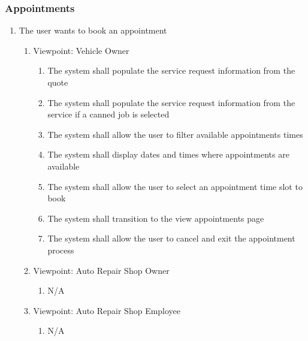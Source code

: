 \documentclass[12pt]{article}
\begin{document}
\subsubsection{Appointments}
\begin{enumerate}[resume*=business_events]
	\item The user wants to book an appointment
	      \begin{enumerate}[VP\arabic*.]
		      \item Viewpoint: Vehicle Owner
		            \begin{enumerate}
			            \item The system shall populate the service request information from the quote
			            \item The system shall populate the service request information from the service if a canned job is
			                  selected
			            \item The system shall allow the user to filter available appointments times
			            \item The system shall display dates and times where appointments are available
			            \item The system shall allow the user to select an appointment time slot to book
			            \item The system shall transition to the view appointments page
			            \item The system shall allow the user to cancel and exit the appointment process
		            \end{enumerate}
		      \item Viewpoint: Auto Repair Shop Owner
		            \begin{enumerate}
			            \item[] N/A
		            \end{enumerate}
		      \item Viewpoint: Auto Repair Shop Employee
		            \begin{enumerate}
			            \item[] N/A
		            \end{enumerate}
	      \end{enumerate}


\end{enumerate}
\end{document}
